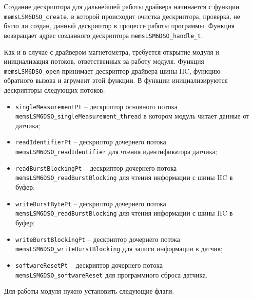 
Создание дескриптора для дальнейшей работы драйвера начинается с функции \lstinline{memsLSM6DSO_create}, в
которой происходит очистка 
дескриптора, проверка, не было ли создан, данный дескриптор в процессе работы программы.
Функция возвращает адрес созданного дескриптора \lstinline{memsLSM6DSO_handle_t}.

Как и в случае с драйвером магнетометра, требуется открытие модуля и инициализация потоков, ответственных за
работу модуля. Функция \lstinline{memsLSM6DSO_open} принимает дескриптор драйвера шины IIC, функцию обратного вызова
и агрумент этой функции. В функции инициализируются дескрипторы следующих потоков:

\begin{itemize}
    \item \lstinline{singleMeasurementPt} -- дескриптор основного потока \lstinline{memsLSM6DSO_singleMeasurement_thread} в котором модуль читает данные от датчика;
    \item \lstinline{readIdentifierPt} -- дескриптор дочернего потока \lstinline{memsLSM6DSO_readIdentifier} для чтения идентификатора датчика;
    \item \lstinline{readBurstBlockingPt} --  дескриптор дочернего потока \lstinline{memsLSM6DSO_readBurstBlocking} для чтения информации с шины IIC в буфер;
    \item \lstinline{writeBurstBytePt} --  дескриптор дочернего потока \lstinline{memsLSM6DSO_readBurstBlocking} для чтения информации с шины IIC в буфер;
    \item \lstinline{writeBurstBlockingPt} --  дескриптор дочернего потока \lstinline{memsLSM6DSO_writeBurstBlocking} для записи информации в датчик;
    \item \lstinline{softwareResetPt} --  дескриптор дочернего потока \lstinline{memsLSM6DSO_softwareReset} для программного сброса датчика.
\end{itemize}

Для работы модуля нужно установить следующие флаги:

